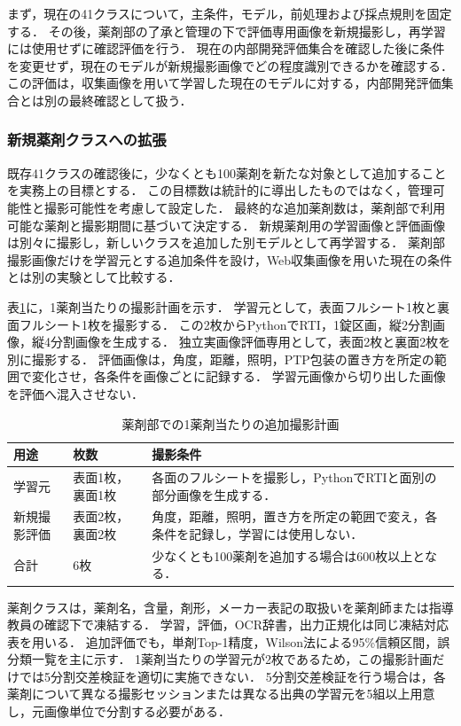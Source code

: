 \documentclass[uplatex,dvipdfmx]{jsarticle}
\begin{document}
まず，現在の41クラスについて，主条件，モデル，前処理および採点規則を固定する．
その後，薬剤部の了承と管理の下で評価専用画像を新規撮影し，再学習には使用せずに確認評価を行う．
現在の内部開発評価集合を確認した後に条件を変更せず，現在のモデルが新規撮影画像でどの程度識別できるかを確認する．
この評価は，収集画像を用いて学習した現在のモデルに対する，内部開発評価集合とは別の最終確認として扱う．

\subsubsection{新規薬剤クラスへの拡張}

既存41クラスの確認後に，少なくとも100薬剤を新たな対象として追加することを実務上の目標とする．
この目標数は統計的に導出したものではなく，管理可能性と撮影可能性を考慮して設定した．
最終的な追加薬剤数は，薬剤部で利用可能な薬剤と撮影期間に基づいて決定する．
新規薬剤用の学習画像と評価画像は別々に撮影し，新しいクラスを追加した別モデルとして再学習する．
薬剤部撮影画像だけを学習元とする追加条件を設け，Web収集画像を用いた現在の条件とは別の実験として比較する．

表\ref{tab:future_capture}に，1薬剤当たりの撮影計画を示す．
学習元として，表面フルシート1枚と裏面フルシート1枚を撮影する．
この2枚からPythonでRTI，1錠区画，縦2分割画像，縦4分割画像を生成する．
独立実画像評価専用として，表面2枚と裏面2枚を別に撮影する．
評価画像は，角度，距離，照明，PTP包装の置き方を所定の範囲で変化させ，各条件を画像ごとに記録する．
学習元画像から切り出した画像を評価へ混入させない．

\begin{table}[H]
  \centering
  \caption{薬剤部での1薬剤当たりの追加撮影計画}
  \label{tab:future_capture}
  \small
  \begin{tabular}{|p{3.0cm}|p{3.0cm}|p{5.8cm}|}
    \hline
    用途 & 枚数 & 撮影条件 \\ \hline
    学習元 & 表面1枚，裏面1枚 & 各面のフルシートを撮影し，PythonでRTIと面別の部分画像を生成する． \\ \hline
    新規撮影評価 & 表面2枚，裏面2枚 & 角度，距離，照明，置き方を所定の範囲で変え，各条件を記録し，学習には使用しない． \\ \hline
    合計 & 6枚 & 少なくとも100薬剤を追加する場合は600枚以上となる． \\ \hline
  \end{tabular}
\end{table}

薬剤クラスは，薬剤名，含量，剤形，メーカー表記の取扱いを薬剤師または指導教員の確認下で凍結する．
学習，評価，OCR辞書，出力正規化は同じ凍結対応表を用いる．
追加評価でも，単剤Top-1精度，Wilson法による95\%信頼区間，誤分類一覧を主に示す．
1薬剤当たりの学習元が2枚であるため，この撮影計画だけでは5分割交差検証を適切に実施できない．
5分割交差検証を行う場合は，各薬剤について異なる撮影セッションまたは異なる出典の学習元を5組以上用意し，元画像単位で分割する必要がある．
\end{document}
